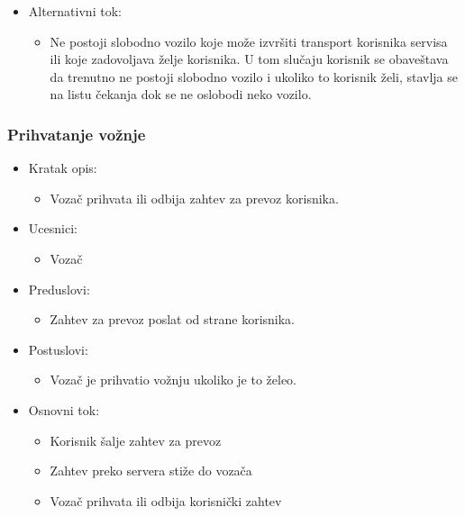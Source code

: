 \begin{itemize}
	\item Alternativni tok:
		\begin{itemize}
    		\item Ne postoji slobodno vozilo koje može izvršiti transport korisnika servisa ili koje zadovoljava želje korisnika. U tom slučaju 
		    korisnik se obaveštava da trenutno ne postoji slobodno  vozilo i ukoliko to korisnik želi, stavlja se na listu čekanja dok se ne oslobodi neko vozilo.
		\end{itemize}
\end{itemize}

\subsubsection{\bfseries Prihvatanje vo\v znje}\begin{itemize}
	\item Kratak opis:
		\begin{itemize}
			\item Vozač prihvata ili odbija zahtev za prevoz korisnika.
		\end{itemize}
 
	\item Ucesnici:
		\begin{itemize}
		    \item Vozač
		\end{itemize}				

	\item Preduslovi:
		\begin{itemize}
		    \item Zahtev za prevoz poslat od strane korisnika.
		\end{itemize}

	\item Postuslovi:
		\begin{itemize}
			\item Vozač je prihvatio vožnju ukoliko je to želeo.
		\end{itemize}		


	\item Osnovni tok:
		\begin{itemize}
		    \item Korisnik šalje zahtev za prevoz
		    \item Zahtev preko servera stiže do vozača
		    \item Vozač prihvata ili odbija korisnički zahtev
		\end{itemize}
\end{itemize}

